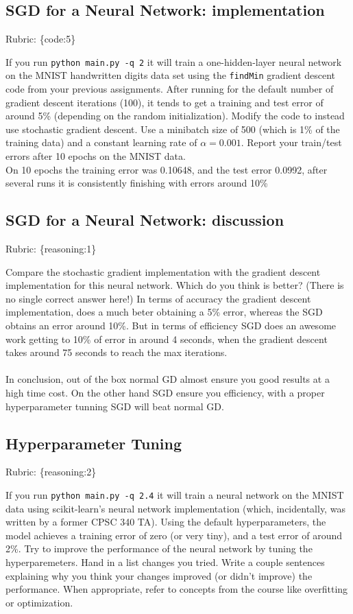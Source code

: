 \documentclass{article}
\def\rubric#1{\gre{Rubric: \{#1\}}}{}
\def\blu#1{{\color{blu}#1}}
\def\gre#1{{\color{gre}#1}}
\def\ans#1{{\color{ans}#1}}
\begin{document}
\subsection{SGD for a Neural Network: implementation}
\rubric{code:5}


If you run \texttt{python main.py -q 2} it will train a one-hidden-layer neural network on the MNIST handwritten digits data set using the \texttt{findMin} gradient descent code from your previous assignments. After running for the default number of gradient descent iterations (100), it tends to get a training and test error of around 5\% (depending on the random initialization). 
\blu{Modify the code to instead use stochastic gradient descent. Use a minibatch size of 500 (which is 1\% of the training data) and a constant learning rate of $\alpha=0.001$. Report your train/test errors after 10 epochs on the MNIST data.}  \\
\ans{
    On 10 epochs the training error was 0.10648, and the test error 0.0992, after several runs it is 
    consistently finishing with errors around 10\%
}

\subsection{SGD for a Neural Network: discussion}
\rubric{reasoning:1}

Compare the stochastic gradient implementation with the gradient descent implementation for this neural network. Which do you think is better? (There is no single correct answer here!) 
\ans{
    In terms of accuracy the gradient descent implementation, does a much beter obtaining a 5\% error, 
    whereas the SGD obtains an error around 10\%. But in terms of efficiency SGD does an awesome work 
    getting to 10\% of error in around 4 seconds, when the gradient descent takes around 75 seconds to 
    reach the max iterations. \\ \\
    In conclusion, out of the box normal GD almost ensure you good results at a high time 
    cost. On the other hand SGD ensure you efficiency, with a proper hyperparameter tunning SGD will 
    beat normal GD.
}

\subsection{Hyperparameter Tuning}
\rubric{reasoning:2}

If you run \texttt{python main.py -q 2.4} it will train a neural network on the MNIST data using scikit-learn's neural network implementation (which, incidentally, was written by a former CPSC 340 TA).
Using the default hyperparameters, the model achieves a training error of zero (or very tiny), and a test error of around 2\%. 
Try to improve the performance of the neural network by tuning the hyperparemeters.
\blu{Hand in a list changes you tried. Write a couple sentences explaining why you think your changes improved (or didn't improve) the performance. When appropriate, refer to concepts from the course like overfitting or optimization.}
\end{document}

